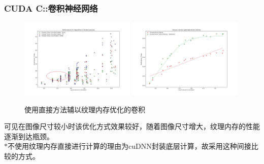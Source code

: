 \documentclass[10pt,aspectratio=169,mathserif]{beamer}
\begin{document}
	\begin{frame}
		\frametitle{CUDA C::卷积神经网络}
		\begin{figure}
			\centering
			\includegraphics[width=5.5cm]{figures/CNN-HALF-3ALGOFWD.jpg}
			\includegraphics[width=5.5cm]{figures/CNN-HALF-TEXOPT.jpg}
			\caption{使用直接方法辅以纹理内存优化的卷积}\label{Fig.CONVTEX}
		\end{figure}
		可见在图像尺寸较小时该优化方式效果较好，随着图像尺寸增大，纹理内存的性能逐渐到达瓶颈。\\
		$ * $不使用纹理内存直接进行计算的理由为cuDNN封装底层计算，故采用这种间接比较的方式。
	\end{frame}
	
\end{document}
